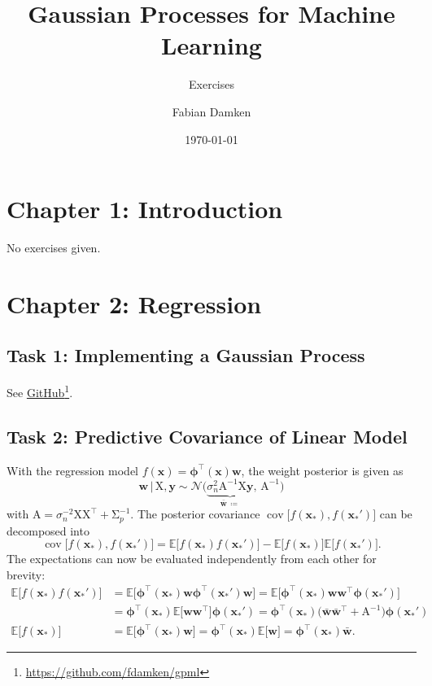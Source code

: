 \documentclass[11pt, a4paper]{scrartcl}
\title{Gaussian Processes for Machine Learning}
\subtitle{Exercises}
\author{Fabian Damken}
\date{\today}
\newcommand{\E}{\mathbb{E}}
\DeclareMathOperator{\cov}{cov}
\newcommand{\normal}{\mathcal{N}}
\newcommand{\transposed}{{\!\top\!}}
\renewcommand{\vec}[1]{\bm{#1}}
\newcommand{\mat}[1]{\bm{\mathrm{#1}}}
\newcommand{\given}{\,\vert\,}
\newcommand{\github}{\href{https://github.com/fdamken/gpml}{GitHub}\footnote{\url{https://github.com/fdamken/gpml}}\xspace}
\newcommand{\seegithub}{See \github.}
\newcommand{\task}[2]{\subsection*{Task #1: #2}}
\begin{document}
	\maketitle

	\section*{Chapter 1: Introduction}
		No exercises given.

	\section*{Chapter 2: Regression}
		\task{1}{Implementing a Gaussian Process}
			\seegithub

		\task{2}{Predictive Covariance of Linear Model}
			With the regression model \( f(\vec{x}) = \vec{\phi}^\transposed(\vec{x}) \vec{w} \), the weight posterior is given as
			\begin{equation}
				\vec{w} \given \mat{X}, \vec{y} \sim \normal\big( \underbrace{\sigma_n^2 \mat{A}^{-1} \mat{X} \vec{y}}_{\bar{\vec{w}} \,\coloneqq},\, \mat{A}^{-1} \big)
			\end{equation}
			with \( \mat{A} = \sigma_n^{-2} \mat{X} \mat{X}^\transposed + \mat{\Sigma}_p^{-1} \). The posterior covariance \( \cov\!\big[ f(\vec{x}_\ast), f(\vec{x}_\ast') \big] \) can be decomposed into
			\begin{equation}
				\cov\!\big[ f(\vec{x}_\ast), f(\vec{x}_\ast') \big] = \E\big[ f(\vec{x}_\ast) f(\vec{x}_\ast') \big] - \E\big[ f(\vec{x}_\ast) \big] \E\big[ f(\vec{x}_\ast') \big].  \label{eq:ch2ex1cov}
			\end{equation}
			The expectations can now be evaluated independently from each other for brevity:
			\begin{align}
				\E\big[ f(\vec{x}_\ast) f(\vec{x}_\ast') \big]
					&= \E\big[ \vec{\phi}^\transposed(\vec{x}_\ast) \vec{w} \vec{\phi}^\transposed(\vec{x}_\ast') \vec{w} \big]
					= \E\big[ \vec{\phi}^\transposed(\vec{x}_\ast) \vec{w} \vec{w}^\transposed \vec{\phi}(\vec{x}_\ast') \big] \\
					&= \vec{\phi}^\transposed(\vec{x}_\ast) \E\big[ \vec{w} \vec{w}^\transposed \big] \vec{\phi}(\vec{x}_\ast')
					= \vec{\phi}^\transposed(\vec{x}_\ast) \big( \bar{\vec{w}} \bar{\vec{w}}^\transposed + \mat{A}^{-1} \big) \vec{\phi}(\vec{x}_\ast') \\
				\E\big[ f(\vec{x}_\ast) \big]
					&= \E\big[ \vec{\phi}^\transposed(\vec{x}_\ast) \vec{w} \big]
					= \vec{\phi}^\transposed(\vec{x}_\ast) \E\big[ \vec{w} \big]
					= \vec{\phi}^\transposed(\vec{x}_\ast) \bar{\vec{w}}.
			\end{align}
\end{document}

